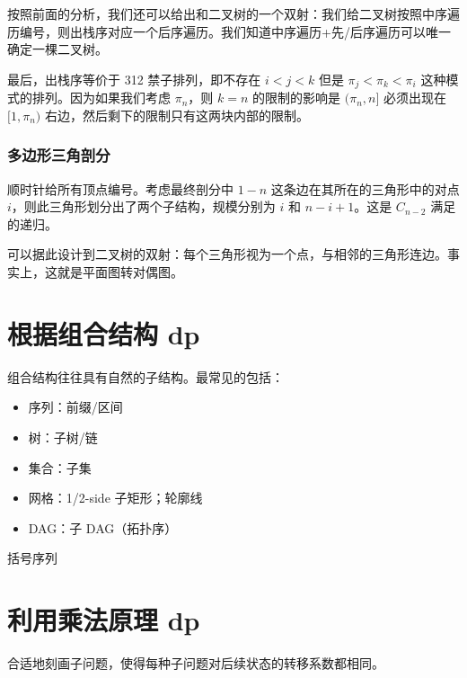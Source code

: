    按照前面的分析，我们还可以给出和二叉树的一个双射：我们给二叉树按照中序遍历编号，则出栈序对应一个后序遍历。我们知道中序遍历+先/后序遍历可以唯一确定一棵二叉树。

    最后，出栈序等价于 312 禁子排列，即不存在 $i<j<k$ 但是 $\pi_j<\pi_k<\pi_i$ 这种模式的排列。因为如果我们考虑 $\pi_n$，则 $k=n$ 的限制的影响是 $(\pi_n,n]$ 必须出现在 $[1,\pi_n)$ 右边，然后剩下的限制只有这两块内部的限制。

\subsubsection{多边形三角剖分}
    顺时针给所有顶点编号。考虑最终剖分中 $1-n$ 这条边在其所在的三角形中的对点 $i$，则此三角形划分出了两个子结构，规模分别为 $i$ 和 $n-i+1$。这是 $C_{n-2}$ 满足的递归。

    可以据此设计到二叉树的双射：每个三角形视为一个点，与相邻的三角形连边。事实上，这就是平面图转对偶图。
\section{根据组合结构 dp}
    组合结构往往具有自然的子结构。最常见的包括：

    \begin{itemize}
        \item 序列：前缀/区间
        \item 树：子树/链
        \item 集合：子集
        \item 网格：1/2-side 子矩形；轮廓线
        \item DAG：子 DAG（拓扑序）
    \end{itemize}

    \begin{example}
        [CSP-S 2021] 括号序列
    \end{example}

\section{利用乘法原理 dp}
    合适地刻画子问题，使得每种子问题对后续状态的转移系数都相同。

